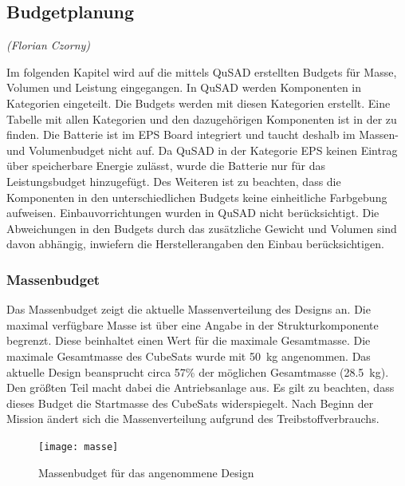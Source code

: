 				\subsection{Budgetplanung}
				\hfill\emph{(Florian Czorny)}
				
Im folgenden Kapitel wird auf die mittels QuSAD erstellten Budgets für Masse, Volumen und Leistung eingegangen. In QuSAD werden Komponenten in Kategorien eingeteilt. Die Budgets werden mit diesen Kategorien erstellt. Eine Tabelle mit allen Kategorien und den dazugehörigen Komponenten ist in der  zu finden. Die Batterie ist im EPS Board integriert und taucht deshalb im Massen- und Volumenbudget nicht auf. Da QuSAD in der Kategorie EPS keinen Eintrag über speicherbare Energie zulässt, wurde die Batterie nur für das Leistungsbudget hinzugefügt. Des Weiteren ist zu beachten, dass die Komponenten in den unterschiedlichen Budgets keine einheitliche Farbgebung aufweisen. Einbauvorrichtungen wurden in QuSAD nicht berücksichtigt. Die Abweichungen in den Budgets durch das  zusätzliche Gewicht und Volumen sind davon abhängig, inwiefern die Herstellerangaben den Einbau berücksichtigen.

						\subsubsection{Massenbudget}
Das Massenbudget  zeigt die aktuelle Massenverteilung des Designs an. Die maximal verfügbare Masse ist über eine Angabe in der Strukturkomponente begrenzt. Diese beinhaltet einen Wert für die maximale Gesamtmasse. Die maximale Gesamtmasse des CubeSats wurde mit \SI{50}{\kilogram} angenommen. Das aktuelle Design beansprucht circa \num{57}\% der möglichen Gesamtmasse (\SI{28,5}{\kilogram}). Den größten Teil macht dabei die Antriebsanlage aus. Es gilt zu beachten, dass dieses Budget die Startmasse des CubeSats widerspiegelt. Nach Beginn der Mission ändert sich die Massenverteilung aufgrund des Treibstoffverbrauchs.
										\begin{figure}[H]
											\centering
												\texttt{[image: masse]}
											\caption{Massenbudget für das angenommene Design}
											\label{fig:masse}
										\end{figure}
								
